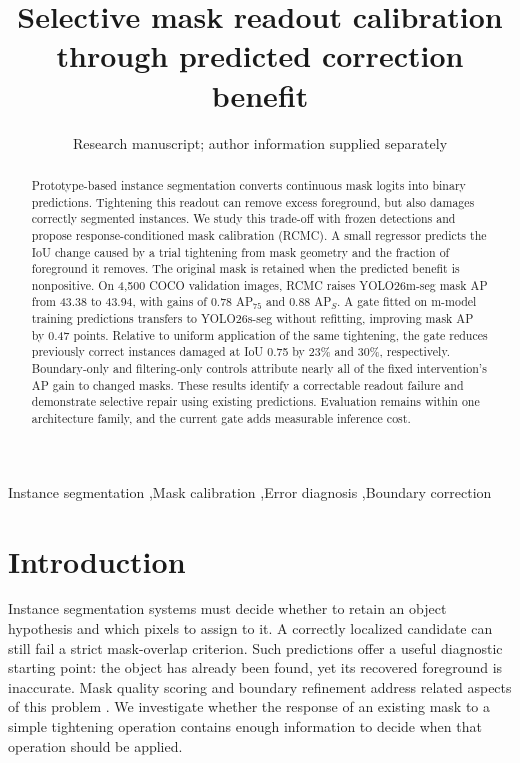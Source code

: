 \documentclass[times,twocolumn,final,authoryear]{elsarticle}
\begin{document}
\begin{frontmatter}
\title{Selective mask readout calibration through predicted correction benefit}
\author{Research manuscript; author information supplied separately}
\begin{abstract}
Prototype-based instance segmentation converts continuous mask logits into binary predictions. Tightening this readout can remove excess foreground, but also damages correctly segmented instances. We study this trade-off with frozen detections and propose response-conditioned mask calibration (RCMC). A small regressor predicts the IoU change caused by a trial tightening from mask geometry and the fraction of foreground it removes. The original mask is retained when the predicted benefit is nonpositive. On 4,500 COCO validation images, RCMC raises YOLO26m-seg mask AP from 43.38 to 43.94, with gains of 0.78 AP$_{75}$ and 0.88 AP$_S$. A gate fitted on m-model training predictions transfers to YOLO26s-seg without refitting, improving mask AP by 0.47 points. Relative to uniform application of the same tightening, the gate reduces previously correct instances damaged at IoU 0.75 by 23\% and 30\%, respectively. Boundary-only and filtering-only controls attribute nearly all of the fixed intervention's AP gain to changed masks. These results identify a correctable readout failure and demonstrate selective repair using existing predictions. Evaluation remains within one architecture family, and the current gate adds measurable inference cost.
\end{abstract}
\begin{keyword}
Instance segmentation \sep Mask calibration \sep Error diagnosis \sep Boundary correction
\end{keyword}
\end{frontmatter}

\section{Introduction}
Instance segmentation systems must decide whether to retain an object hypothesis and which pixels to assign to it. A correctly localized candidate can still fail a strict mask-overlap criterion. Such predictions offer a useful diagnostic starting point: the object has already been found, yet its recovered foreground is inaccurate. Mask quality scoring and boundary refinement address related aspects of this problem \citep{huang2019maskscoring,kirillov2020pointrend,tang2021bpr}. We investigate whether the response of an existing mask to a simple tightening operation contains enough information to decide when that operation should be applied.
\end{document}
